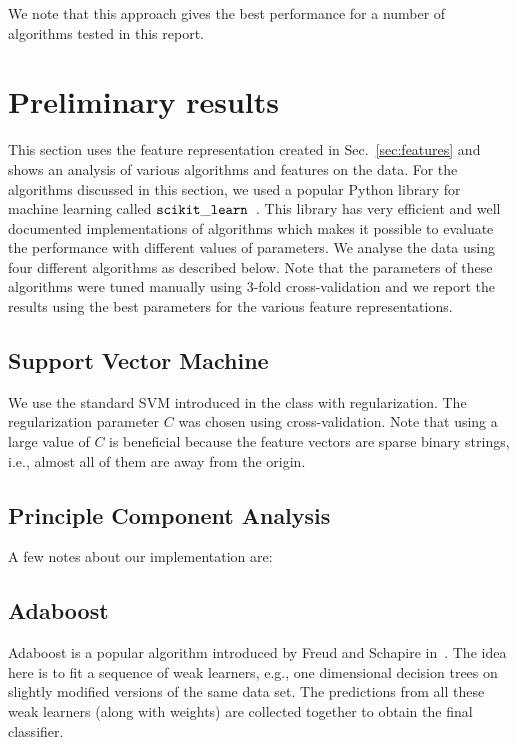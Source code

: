 \documentclass[11pt, letterpaper, conference, final, twocolumn]{ieeeconf}
\begin{document}
We note that this approach gives the best performance for a number of algorithms tested in this report.

\section{Preliminary results}
\label{sec:prelim}

This section uses the feature representation created in Sec.~\ref{sec:features} and shows an analysis of various algorithms and features on the data.
For the algorithms discussed in this section, we used a popular Python library for machine learning called $\tt scikit\_learn$~\cite{scikit-learn}. This library has very efficient and well documented implementations of algorithms which makes it possible to evaluate the performance with different values of parameters. We analyse the data using four different algorithms as described below. Note that the parameters of these algorithms were tuned manually using $3$-fold cross-validation and we report the results using the best parameters for the various feature representations.

\subsection{Support Vector Machine}
\label{ssec:svm}

We use the standard SVM introduced in the class with regularization. The regularization parameter $C$ was chosen using cross-validation. Note that using a large value of $C$ is beneficial because the feature vectors are sparse binary strings, i.e., almost all of them are away from the origin.

\subsection{Principle Component Analysis}
\label{ssec:pca}

A few notes about our implementation are:

\subsection{Adaboost}
\label{ssec:adaboost}
%
Adaboost is a popular algorithm introduced by Freud and Schapire in~\cite{freund1999short}. The idea here is to fit a sequence of weak learners, e.g., one dimensional decision trees on slightly modified versions of the same data set. The predictions from all these weak learners (along with weights) are collected together to obtain the final classifier.
\end{document}
